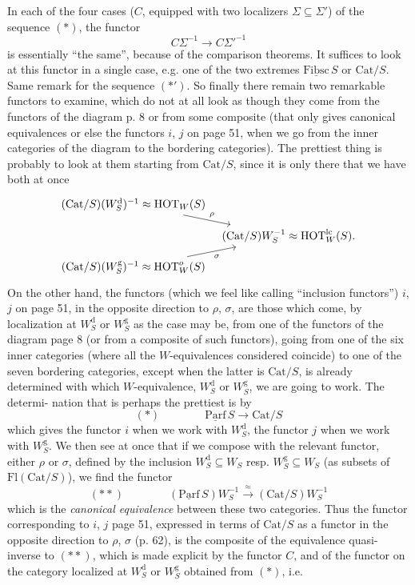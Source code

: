 \documentclass[11pt]{article}
\newcommand{\msp}[1]{\marginpar{\footnotesize [#1]}}
\newcommand{\ul}[1]{\underline{\mathrm{#1}}}
\begin{document}
In each of the four cases ($C$, equipped with two localizers $\Sigma \subseteq \Sigma'$) of the sequence $(*)$, the functor
\[C\Sigma^{-1} \longrightarrow C\Sigma'^{-1}\]
is essentially ``the same'', because of the comparison theorems. It suffices to look at this functor in a single case, e.g. one of the two extremes $\ul{Fibsc}\,S$ or $\mathrm{Cat}/S$. Same remark for the sequence $(*')$. So finally there remain two remarkable functors %
\msp{page 62}
to examine, which do not at all look as though they come from the functors of the diagram p. 8 or from some composite (that only gives canonical equivalences or else the functors $i$, $j$ on page 51, when we go from the inner categories of the diagram to the bordering categories). The prettiest thing is probably to look at them starting from $\mathrm{Cat}/S$, since it is only there that we have both at once
\[
\begin{tikzcd}[row sep=small, column sep=tiny]
(\mathrm{Cat}/S)(W_S^{\mathrm{d}})^{-1} \approx \mathrm{HOT}_W(S) \arrow[dr, "\rho"] & \\
& (\mathrm{Cat}/S)W_S^{-1} \approx \mathrm{HOT}_W^{\mathrm{lc}}(S). \\
(\mathrm{Cat}/S)(W_S^{\mathrm{g}})^{-1} \approx \mathrm{HOT}_W^{o}(S) \arrow[ur, "\sigma"'] &
\end{tikzcd}
\]
On the other hand, the functors (which we feel like calling ``inclusion functors'') $i$, $j$ on page 51, in the opposite direction to $\rho$, $\sigma$, are those which come, by localization at $W_S^{\mathrm{d}}$ or $W_S^{\mathrm{g}}$ as the case may be, from one of the functors of the diagram page 8 (or from a composite of such functors), going from one of the six inner categories (where all the $W$-equivalences considered coincide) to one of the seven bordering categories, except when the latter is $\mathrm{Cat}/S$, is already determined with which $W$-equivalence, $W_S^{\mathrm{d}}$ or $W_S^{\mathrm{g}}$, we are going to work. The determi-\msp{page 63}%
nation that is perhaps the prettiest is by
\[(*) \qquad\qquad \ul{Parf}\,S \longrightarrow \mathrm{Cat}/S\]
which gives the functor $i$ when we work with $W_S^{\mathrm{d}}$, the functor $j$ when we work with $W_S^{\mathrm{g}}$. We then see at once that if we compose with the relevant functor, either $\rho$ or $\sigma$, defined by the inclusion $W_S^{\mathrm{d}} \subseteq W_S$ resp. $W_S^{\mathrm{g}} \subseteq W_S$ (as subsets of $\mathrm{Fl}(\mathrm{Cat}/S)$), we find the functor
\[(**) \qquad\qquad (\ul{Parf}\,S)W_S^{-1} \xrightarrow{\approx} (\mathrm{Cat}/S)W_S^{-1}\]
which is the \textit{canonical equivalence} between these two categories. Thus the functor corresponding to $i$, $j$ page 51, expressed in terms of $\mathrm{Cat}/S$ as a functor in the opposite direction to $\rho$, $\sigma$ (p. 62), is the composite of the equivalence quasi-inverse to $(**)$, which is made explicit by the functor $C$, and of the functor on the category localized at $W_S^{\mathrm{d}}$ or $W_S^{\mathrm{g}}$ obtained from $(*)$, i.e.
\end{document}
